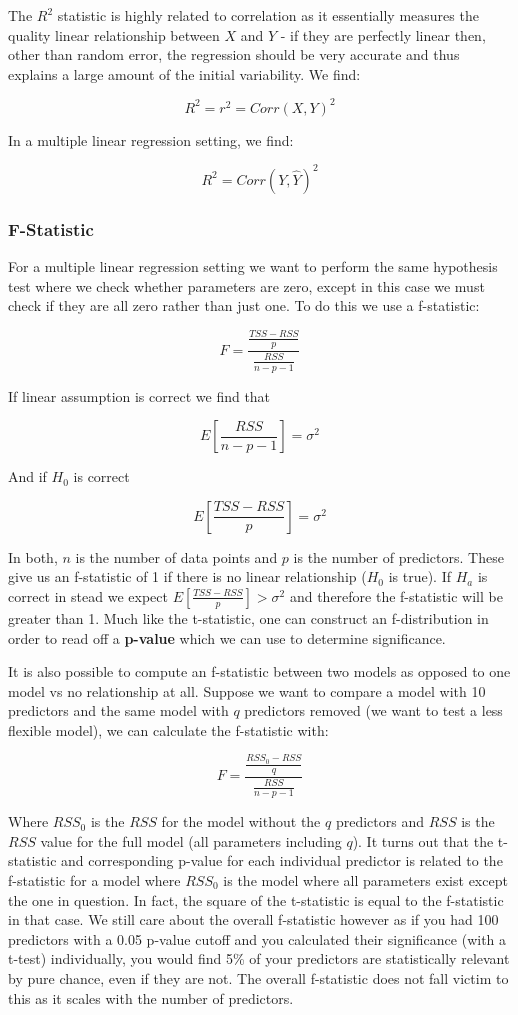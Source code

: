The $R^{2}$ statistic is highly related to correlation as it essentially measures the quality linear relationship between $X$ and $Y$ - if they are perfectly linear then, other than random error, the regression should be very accurate and thus explains a large amount of the initial variability. We find:

$$ R^{2} = r^{2} = Corr(X,Y)^{2} $$

In a multiple linear regression setting, we find:

$$ R^{2} = Corr(Y,\hat{Y})^{2} $$

\subsubsection{F-Statistic}

For a multiple linear regression setting we want to perform the same hypothesis test where we check whether parameters are zero, except in this case we must check if they are all zero rather than just one. To do this we use a f-statistic:

$$ F = \frac{\frac{TSS-RSS}{p}}{\frac{RSS}{n-p-1}} $$

If linear assumption is correct we find that

$$ E[\frac{RSS}{n-p-1}] = \sigma^{2} $$

And if $H_{0}$ is correct

$$ E[\frac{TSS-RSS}{p}] = \sigma^{2} $$

In both, $n$ is the number of data points and $p$ is the number of predictors. These give us an f-statistic of 1 if there is no linear relationship ($H_{0}$ is true). If $H_{a}$ is correct in stead we expect $ E[\frac{TSS-RSS}{p}] > \sigma^{2} $ and therefore the f-statistic will be greater than 1. Much like the t-statistic, one can construct an f-distribution in order to read off a \textbf{p-value} which we can use to determine significance.

It is also possible to compute an f-statistic between two models as opposed to one model vs no relationship at all. Suppose we want to compare a model with 10 predictors and the same model with $q$ predictors removed (we want to test a less flexible model), we can calculate the f-statistic with:

$$ F = \frac{\frac{RSS_{0}-RSS}{q}}{\frac{RSS}{n-p-1}} $$

Where $RSS_{0}$ is the $RSS$ for the model without the $q$ predictors and $RSS$ is the $RSS$ value for the full model (all parameters including $q$). It turns out that the t-statistic and corresponding p-value for each individual predictor is related to the f-statistic for a model where $RSS_{0}$ is the model where all parameters exist except the one in question. In fact, the square of the t-statistic is equal to the f-statistic in that case. We still care about the overall f-statistic however as if you had 100 predictors with a 0.05 p-value cutoff and you calculated their significance (with a t-test) individually, you would find 5\% of your predictors are statistically relevant by pure chance, even if they are not. The overall f-statistic does not fall victim to this as it scales with the number of predictors.

